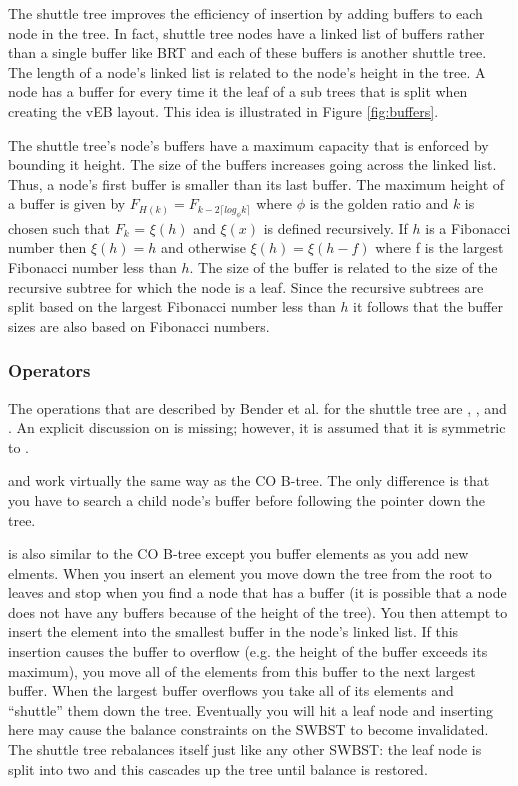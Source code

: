 \documentclass{style}
\begin{document}
The shuttle tree improves the efficiency of insertion by adding buffers to
each node in the tree. In fact, shuttle tree nodes have a linked list of
buffers rather than a single buffer like BRT and each of these buffers is
another shuttle tree. The length of a node's linked list is related to the
node's height in the tree. A node has a buffer for every time it the leaf of a
sub trees that is split when creating the vEB layout. This idea is illustrated
in Figure \ref{fig:buffers}.

The shuttle tree's node's buffers have a maximum capacity that is enforced by
bounding it height. The size of the buffers increases going across the linked
list. Thus, a node's first buffer is smaller than its last buffer. The maximum
height of a buffer is given by $F_{H(k)} = F_{k-2 \lceil log_{\phi} k \rceil}
$ where $\phi$ is the golden ratio and $k$ is chosen such that $F_k$ =
$\xi(h)$ and $\xi(x)$ is defined recursively. If $h$ is a Fibonacci number
then $\xi(h) = h$ and otherwise $\xi(h) = \xi(h-f)$ where f is the largest
Fibonacci number less than $h$. The size of the buffer is related to the size
of the recursive subtree for which the node is a leaf. Since the recursive
subtrees are split based on the largest Fibonacci number less than $h$ it
follows that the buffer sizes are also based on Fibonacci numbers.

\subsubsection{Operators}

The operations that are described by Bender et al. for the shuttle tree are
\Search, \Insert, and \Scan. An explicit discussion on \Delete is missing;
however, it is assumed that it is symmetric to \Insert.

\Search and \Scan work virtually the same way as the CO B-tree. The only
difference is that you have to search a child node's buffer before following
the pointer down the tree.

\Insert is also similar to the CO B-tree except you buffer elements as you add
new elments. When you insert an element you move down the tree from the root
to leaves and stop when you find a node that has a buffer (it is possible that
a node does not have any buffers because of the height of the tree). You then
attempt to insert the element into the smallest buffer in the node's linked
list. If this insertion causes the buffer to overflow (e.g. the height of the
buffer exceeds its maximum), you move all of the elements from this buffer to
the next largest buffer. When the largest buffer overflows you take all of its
elements and ``shuttle'' them down the tree. Eventually you will hit a leaf
node and inserting here may cause the balance constraints on the SWBST to
become invalidated. The shuttle tree rebalances itself just like any other
SWBST: the leaf node is split into two and this cascades up the tree until
balance is restored.
\end{document}
